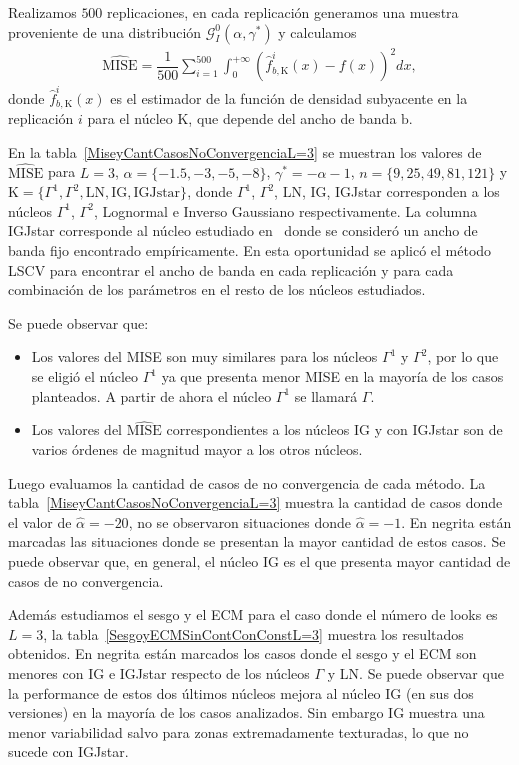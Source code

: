 Realizamos $500$ replicaciones, en cada replicación generamos una muestra proveniente de una distribución $\mathcal{G}_I^0(\alpha,\gamma^*)$ y calculamos 
\begin{align}
\label{MiseEst}
\widehat{\text{MISE}}=\dfrac{1}{500} \sum_{i=1}^{500}\int_0^{+\infty} (\widehat{f}_{b,\text{K}}^i(x)-f(x))^2 dx,
\end{align}
donde $\widehat{f}_{b,\text{K}}^i(x)$ es el estimador de la función de densidad subyacente en la replicación $i$ para el núcleo $\text{K}$, que depende del ancho de banda $\text{b}$.

En la tabla~\ref{MiseyCantCasosNoConvergenciaL=3} se muestran los valores de $\widehat{\text{MISE}}$ para $L=3$, $\alpha=\{-1.5,-3,-5,-8\}$, $\gamma^*=-\alpha-1$, $n=\{9,25,49,81,121\}$ y $\text{K}=\{\Gamma^1,\Gamma^2,\text{LN},\text{IG},\text{IGJstar\}}$, donde $\Gamma^1$, $\Gamma^2$, LN, IG, IGJstar corresponden a los núcleos $\Gamma^1$, $\Gamma^2$, Lognormal e Inverso Gaussiano respectivamente. La columna IGJstar corresponde al núcleo estudiado en~\cite{gambini2015} donde se consideró un ancho de banda fijo encontrado empíricamente. En esta oportunidad se aplicó el método LSCV para encontrar el ancho de banda en cada replicación y para cada combinación de los parámetros en el resto de los núcleos estudiados.

Se puede observar que:
\begin{itemize}
	\item Los valores del MISE son muy similares para los núcleos $\Gamma^1$ y $\Gamma^2$, por lo que se eligió el núcleo $\Gamma^1$ ya que presenta menor MISE en la mayoría de los casos planteados. A partir de ahora el núcleo $\Gamma^1$ se llamará $\Gamma$.
	\item Los valores del $\widehat{\text{MISE}}$ correspondientes a los núcleos IG y con IGJstar son de varios órdenes de magnitud mayor a los otros núcleos.
\end{itemize} 

Luego evaluamos la cantidad de casos de no convergencia de cada método. La tabla~\ref{MiseyCantCasosNoConvergenciaL=3} muestra la cantidad de casos donde el valor de $\widehat{\alpha}=-20$, no se observaron situaciones donde $\widehat{\alpha}=-1.$ En negrita están marcadas las situaciones donde se presentan la mayor cantidad de estos casos. Se puede observar que, en general, el núcleo IG es el que presenta mayor cantidad de casos de no convergencia.

Además estudiamos el sesgo y el ECM para el caso donde el número de looks es $L=3$, la tabla~\ref{SesgoyECMSinContConConstL=3} muestra los resultados obtenidos. En negrita están marcados los casos donde el sesgo y el ECM son menores con IG e IGJstar respecto de los núcleos $\Gamma$ y LN. Se puede observar que la performance de estos dos últimos núcleos  mejora al núcleo IG (en sus dos versiones) en la mayoría de los casos analizados. Sin embargo IG muestra una menor variabilidad salvo para zonas extremadamente texturadas, lo que no sucede con IGJstar. 

